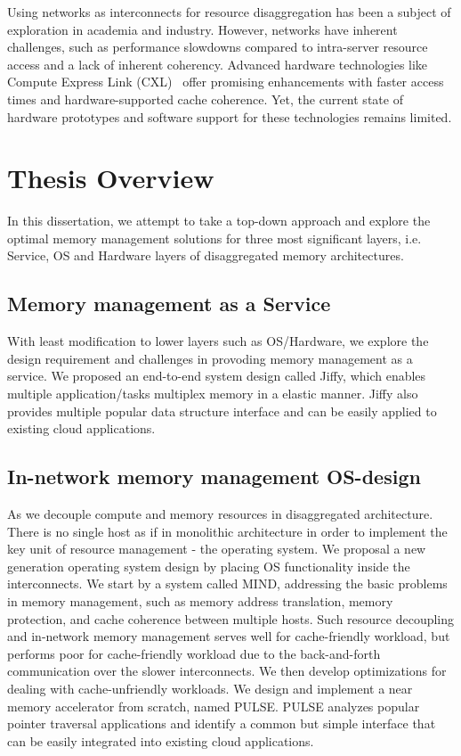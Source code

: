  Using networks as interconnects for resource disaggregation has been a subject of exploration in academia and industry. However, networks have inherent challenges, such as performance slowdowns compared to intra-server resource access and a lack of inherent coherency. Advanced hardware technologies like Compute Express Link (CXL)~\cite{cxl, cxlasic, pond} offer promising enhancements with faster access times and hardware-supported cache coherence. Yet, the current state of hardware prototypes and software support for these technologies remains limited.

\section{Thesis Overview}

In this dissertation, we attempt to take a top-down approach and explore the optimal memory management solutions for three most significant layers, i.e. Service, OS and Hardware layers of disaggregated memory architectures.

\subsection{Memory management as a Service}
With least modification to lower layers such as OS/Hardware, we explore the design requirement and challenges in provoding memory management as a service. We proposed an end-to-end system design called Jiffy, which enables multiple application/tasks multiplex memory in a elastic manner. Jiffy also provides multiple popular data structure interface and can be easily applied to existing cloud applications.
\subsection{In-network memory management OS-design}
As we decouple compute and memory resources in disaggregated architecture. There is no single host as if in monolithic architecture in order to implement the key unit of resource management - the operating system. We proposal a new generation operating system design by placing OS functionality inside the interconnects. We start by a system called MIND, addressing the basic problems in memory management, such as memory address translation, memory protection, and cache coherence between multiple hosts. Such resource decoupling and in-network memory management serves well for cache-friendly workload, but performs poor for cache-friendly workload due to the back-and-forth communication over the slower interconnects. We then develop optimizations for dealing with cache-unfriendly workloads. We design and implement a near memory accelerator from scratch, named PULSE. PULSE analyzes popular pointer traversal applications and identify a common but simple interface that can be easily integrated into existing cloud applications.
